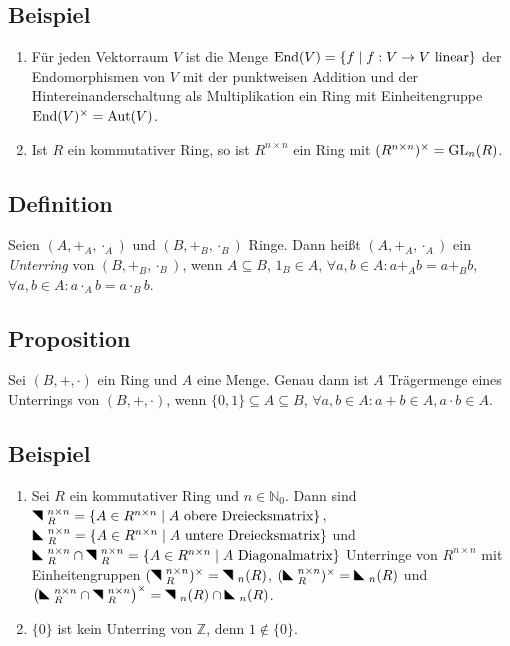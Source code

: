 \subsection{Beispiel}
\begin{enumerate}[label=(\alph*)]
	\item
		Für jeden Vektorraum $V$ ist die Menge $\operatorname{End}(V)=\{f \mid f: V \to V ~ \text{linear}\}$ der Endomorphismen von $V$ mit der punktweisen Addition und der Hintereinanderschaltung als Multiplikation ein Ring mit Einheitengruppe $\operatorname{End}(V)^{\times} = \operatorname{Aut}(V)$. 
		
	\item
		Ist $R$ ein kommutativer Ring, so ist $R^{n \times n}$ ein  Ring mit $(R^{n \times n})^{\times} = \operatorname{GL}_n(R)$.
\end{enumerate}

\subsection{Definition} Seien $(A,+_A,\cdot_A)$ und $(B,+_B,\cdot_B)$ Ringe. Dann heißt $(A,+_A,\cdot_A)$ ein \emph{Unterring}  von $(B,+_B,\cdot_B)$, wenn $A \subseteq B$, $1_B \in A$, $\forall a,b \in A: a +_A b = a +_B b$, $\forall a,b \in A : a \cdot_A b = a \cdot_B b$.
 
\subsection{Proposition}
 Sei $(B,+,\cdot)$ ein Ring und $A$ eine Menge. Genau dann ist $A$ Trägermenge eines Unterrings von $(B,+,\cdot)$, wenn $\{0,1\} \subseteq A \subseteq B$, $\forall a,b \in A: a+b \in A, a \cdot b \in A$.
 
\subsection{Beispiel}
\begin{enumerate}[label=(\alph*)]
	\item
		Sei $R$ ein kommutativer Ring und  $n \in \mathbb{N}_0$. Dann sind $\Odm_R^{n \times n} = \{ A \in R^{n \times n} \mid A \text{ obere Dreiecksmatrix}\}$, $\Udm_R^{n \times n} = \{ A \in R^{n \times n} \mid A \text{ untere Dreiecksmatrix}\}$ und $\Udm_R^{n \times n} \cap \Odm_R^{n \times n} = \{ A \in R^{n \times n} \mid A \text{ Diagonalmatrix}\}$ Unterringe von $R^{n \times n}$ mit Einheitengruppen $(\Odm_R^{n \times n})^{\times} = \Odm_n(R)$, $(\Udm_R^{n \times n})^{\times} = \Udm_n(R)$ und $\left(\Udm_R^{n \times n} \cap \Odm_R^{n \times n}\right)^{\times} = \Odm_n(R) \cap \Udm_n(R)$.
		
	\item
		$\{ 0 \}$ ist kein Unterring von $\mathbb{Z}$, denn $1 \notin \{0\}$.
\end{enumerate}

